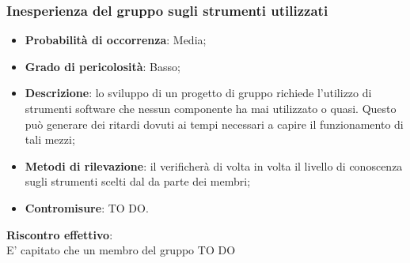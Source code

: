 		\subsubsection{Inesperienza del gruppo sugli strumenti utilizzati} %
		\label{ssub:inesperienza_del_gruppo_sugli_strumenti_utilizzati}
			\begin{itemize}
				\item \textbf{Probabilità di occorrenza}: Media;
				\item \textbf{Grado di pericolosità}: Basso;
				\item \textbf{Descrizione}: lo sviluppo di un progetto di gruppo richiede l'utilizzo di strumenti software che nessun componente ha mai utilizzato o quasi. Questo può generare dei ritardi dovuti ai tempi necessari a capire il funzionamento di tali mezzi;
				\item \textbf{Metodi di rilevazione}: il \roleProjectManager{} verificherà di volta in volta il livello di conoscenza sugli strumenti  scelti dal \roleAdministrator{} da parte dei membri;
				\item \textbf{Contromisure}: TO DO.
			\end{itemize}
		\noindent
		\textbf{Riscontro effettivo}: \\
		E' capitato che un membro del gruppo TO DO
	
	
	
